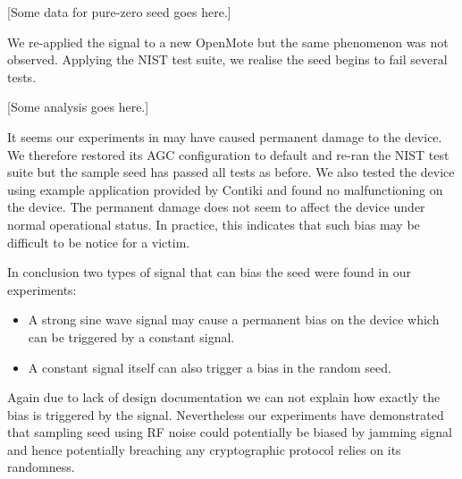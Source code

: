 [Some data for pure-zero seed goes here.]

We re-applied the signal to a new OpenMote but the same phenomenon was not observed. Applying the NIST test suite, we realise the seed begins to fail several tests. 

[Some analysis goes here.]

It seems our experiments in  may have caused permanent damage to the device. We therefore restored its AGC configuration to default and re-ran the NIST test suite but the sample seed has passed all tests as before. We also tested the device using example application provided by Contiki and found no malfunctioning on the device. The permanent damage does not seem to affect the device under normal operational status. In practice, this indicates that such bias may be difficult to be notice for a victim.

In conclusion two types of signal that can bias the seed were found in our experiments:
\begin{itemize}
	\item A strong sine wave signal may cause a permanent bias on the device which can be triggered by a constant signal.
	\item A constant signal itself can also trigger a bias in the random seed.
\end{itemize}

Again due to lack of design documentation we can not explain how exactly the bias is triggered by the signal. Nevertheless our experiments have demonstrated that sampling seed using RF noise could potentially be biased by jamming signal and hence potentially breaching any cryptographic protocol relies on its randomness.